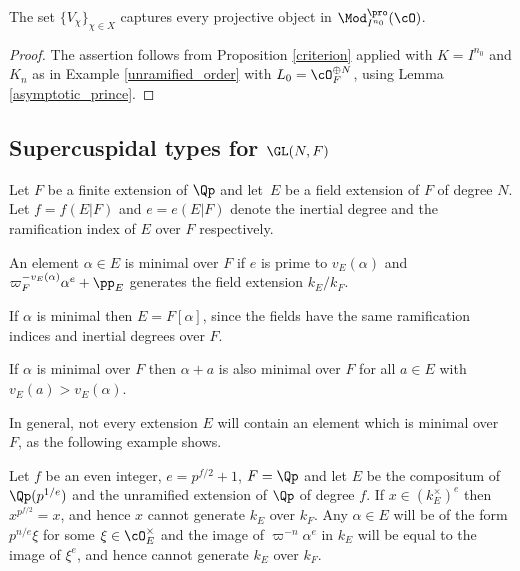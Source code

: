 \begin{prop} The set $\{ V_{\chi}\}_ {\chi\in X}$ captures every projective object in $\Mod^{\pro}_{I^{n_0}}(\cO)$.
\end{prop}

\begin{proof} The assertion follows from Proposition \ref{criterion} applied with $K=I^{n_0}$ and $K_n$ as in Example \ref{unramified_order} with $L_0= \cO_F^{\oplus N}$,
using Lemma \ref{asymptotic_prince}.
\end{proof}

\subsection{Supercuspidal types for $\GL(N, F)$}\label{sec_super}
Let $F$ be a finite extension of $\Qp$ and let~$E$ be a field extension of $F$ of degree $N$. Let $f=f(E|F)$ and $e=e(E|F)$ denote the inertial degree and the ramification
index of $E$ over $F$ respectively.

\begin{defi}[{\cite[(1.4.14)]{BK}}] An element $\alpha\in E$ is minimal over $F$ if $e$ is prime to $v_E(\alpha)$ and $\varpi_F^{-v_E(\alpha)} \alpha^e +\pp_E$ generates
the field extension $k_E/k_F$.
\end{defi}

\begin{remark} If $\alpha$ is minimal then $E=F[\alpha]$, since the fields have the same ramification indices and inertial degrees over $F$.
\end{remark}

\begin{remark} If $\alpha$ is minimal over $F$ then $\alpha +a$ is also minimal over $F$ for all $a\in E$ with $v_E(a)> v_E(\alpha)$.
\end{remark}

In general, not every extension $E$ will contain an element which is minimal over~$F$, as the following example shows.

\begin{examp} Let $f$ be an even integer, $e=p^{f/2}+1$, $F=\Qp$ and let $E$ be the compositum of $\Qp(p^{1/e})$ and the unramified extension
of $\Qp$ of degree $f$. If $x\in (k_E^{\times})^e$ then $x^{p^{f/2}}=x$, and hence $x$ cannot generate $k_E$ over $k_F$. Any $\alpha\in E$ will
be of the form $p^{n/e}\xi$ for some $\xi\in \cO_E^{\times}$ and the image of $\varpi^{-n} \alpha^e$ in $k_E$ will be equal to the image of $\xi^e$,
and hence cannot generate $k_E$ over $k_F$.
\end{examp}

